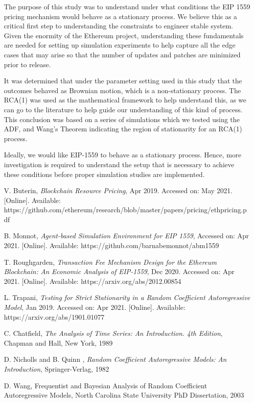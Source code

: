 \documentclass{article}
\begin{document}
The purpose of this study was to understand under what conditions the EIP 1559 pricing mechanism would behave as a stationary process. We believe this as a critical first step to understanding the constraints to engineer stable system. Given the enormity of the Ethereum project, understanding these fundamentals are needed for setting up simulation experiments to help capture all the edge cases that may arise so that the number of updates and patches are minimized prior to release.

It was determined that under the parameter setting used in this study that the outcomes behaved as Brownian motion, which is a non-stationary process. The RCA(1) was used as the mathematical framework to help understand this, as we can go to the literature to help guide our understanding of this kind of process. This conclusion was based on a series of simulations which we tested using the ADF, and Wang's Theorem indicating the region of stationarity for an RCA(1) process. 

Ideally, we would like EIP-1559 to behave as a stationary process. Hence, more investigation is required to understand the setup that is necessary to achieve these conditions before proper simulation studies are implemented.

\begin{thebibliography}{1}

 V. Buterin,  \textit{Blockchain Resource Pricing}, Apr 2019. Accessed on: May 2021. [Online]. Available: https://github.com/ethereum/research/blob/master/papers/pricing/ethpricing.pdf

 B. Monnot, \textit{Agent-based Simulation Environment for EIP 1559}, Accessed on: Apr 2021.  [Online]. Available:  https://github.com/barnabemonnot/abm1559

 T. Roughgarden, \textit{Transaction Fee Mechanism Design for the Ethereum Blockchain: An Economic Analysis of EIP-1559}, Dec 2020. Accessed on: Apr 2021. [Online]. Available: https://arxiv.org/abs/2012.00854

 L. Trapani, \textit{Testing for Strict Stationarity in a Random Coefficient Autoregressive Model}, Jan 2019. Accessed on: Apr 2021. [Online]. Available: https://arxiv.org/abs/1901.01077

 C. Chatfield, \textit{The Analysis of Time Series: An Introduction. 4th Edition}, Chapman and Hall, New York, 1989

 D. Nicholls and B. Quinn , \textit{Random Coefficient Autoregressive Models: An Introduction}, Springer-Verlag, 1982

 D. Wang, Frequentist and Bayesian Analysis of Random Coefficient Autoregressive Models, North Carolina State University PhD Dissertation, 2003



\end{thebibliography}
\end{document}
